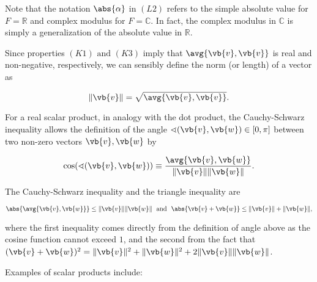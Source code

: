 \documentclass[a4paper,12pt]{report}
\begin{document}
Note that the notation \(\abs{\alpha } \) in \((L2)\) refers to the simple absolute value for \(F = \mathbb{R}\) and complex modulus for \(F = \mathbb{C}\). In fact, the complex modulus in \(\mathbb{C}\) is simply a generalization of the absolute value in \(\mathbb{R}\).     

Since properties \((K1) \text { and } (K3)\) imply that \(\avg{\vb{v} ,\vb{v} } \) is real and non-negative, respectively, we can sensibly define the norm (or length) of a vector as 

\begin{equation}
    \lVert \vb{v} \rVert   = \sqrt{\avg{\vb{v} ,\vb{v} } }. 
\end{equation}

For a real scalar product, in analogy with the dot product, the Cauchy-Schwarz inequality allows the definition of the angle \(\sphericalangle (\vb{v} ,\vb{w} ) \in  [0,\pi ]\) between two non-zero vectors \(\vb{v} ,\vb{w} \) by

\begin{equation}
    \cos (\sphericalangle (\vb{v} ,\vb{w} )) \equiv \frac{\avg{\vb{v} ,\vb{w} } }{\lVert \vb{v} \rVert\lVert \vb{w} \rVert  }.
\end{equation}

The Cauchy-Schwarz inequality and the triangle inequality are 

\begin{equation}
    \abs{\avg{\vb{v} ,\vb{w} } } \le \lVert \vb{v} \rVert\lVert \vb{w} \rVert ~\text { and }~  \abs{\vb{v} + \vb{w} } \le \lVert \vb{v} \rVert + \lVert \vb{w} \rVert,      
\end{equation}


where the first inequality comes directly from the definition of angle above as the cosine function cannot exceed \(1\), and the second from the fact that \((\vb{v} +\vb{w} )^2 = \lVert \vb{v} \rVert^2+\lVert \vb{w} \rVert^2 + 2\lVert \vb{v} \rVert\lVert \vb{w} \rVert     \). 

Examples of scalar products include:
\end{document}
